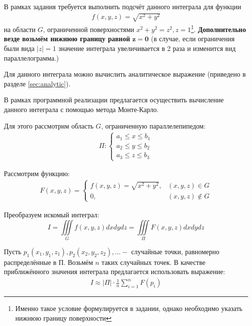 \documentclass[12pt, fleqn]{article}
\theoremstyle{definition}
\begin{document}
В рамках задания требуется выполнить подсчёт данного интеграла для функции
\abovedisplayskip=1pt
\belowdisplayskip=2pt
\noindent
\begin{gather}
 f(x, y, z) = \sqrt{x^2 + y^2}
 \label{eq:func}
\end{gather}
на области $G$, ограниченной поверхностями $x^{2}+y^{2}=z^{2}, z=1$\footnote{Именно такое условие формулируется в задании, однако необходимо указать нижнюю границу поверхности}. \textbf{Дополнительно везде возьмём нижнюю границу равной} $\mathbf{z=0}$ (в случае, если ограничения были вида $|z|=1$ значение интеграла увеличивается в 2 раза и изменится вид параллелограмма.)

Для данного интеграла можно вычислить аналитическое выражение (приведено в разделе \ref{sec:analytic}).

В рамках программной реализации предлагается осуществить вычисление данного интеграла с помощью метода Монте-Карло.

Для этого рассмотрим область $G$, ограниченную параллелепипедом: 
\abovedisplayskip=1pt
\belowdisplayskip=2pt
\noindent
\begin{gather}
 \Pi:\left\{\begin{array}{l}a_{1} \leqslant x \leqslant b_{1} \\ a_{2} \leqslant y \leqslant b_{2} \\ a_{3} \leqslant z \leqslant b_{3}\end{array}\right.
 \label{eq:Pi}
\end{gather}


Рассмотрим функцию: 
\abovedisplayskip=1pt
\belowdisplayskip=2pt
\noindent
\begin{gather}
 F(x, y, z)= \begin{cases}f(x, y, z) = \sqrt{x^2 + y^2}, & (x, y, z) \in G \\ 0, & (x, y, z) \notin G\end{cases}
 \label{eq:F}
\end{gather}

Преобразуем искомый интеграл:
\abovedisplayskip=1pt
\belowdisplayskip=2pt
\noindent
$$
I=\iiint\limits_{G} f(x, y, z) d x d y d z=\iiint\limits_{\Pi} F(x, y, z) d x d y d z
$$

Пусть $p_{1}\left(x_{1}, y_{1}, z_{1}\right), p_{2}\left(x_{2}, y_{2}, z_{2}\right), \ldots-$ случайные точки, равномерно распределённые в П. Возьмём $n$ таких случайных точек. В качестве приближённого значения интеграла предлагается использовать выражение:
\abovedisplayskip=1pt
\noindent
\begin{gather}
I \approx|\Pi| \cdot \frac{1}{n} \sum_{i=1}^{n} F\left(p_{i}\right)
\label{eq:MC}
\end{gather}
\end{document}
